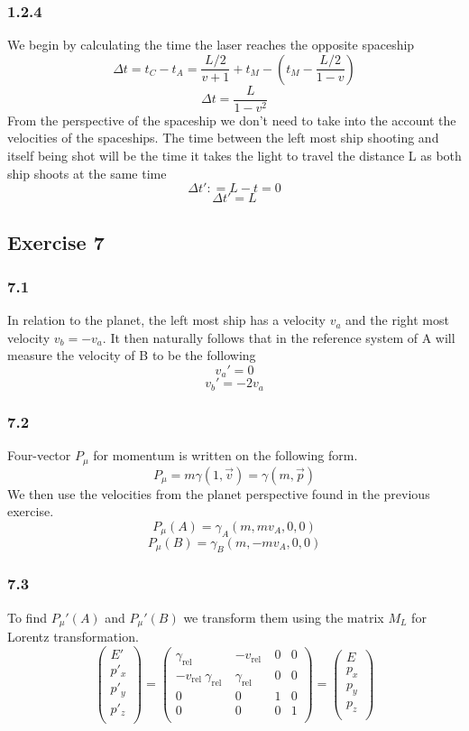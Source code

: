 \documentclass[reprint,english,notitlepage]{revtex4-2}
\begin{document}
\subsubsection*{1.2.4}\label{1.2.4}
We begin by calculating the time the laser reaches the opposite spaceship
\[
Δt =  t_C - t_A = \frac{L / 2}{v +1} + t_M - \left( t_M - \frac{L / 2}{1 - v} \right) 
\]
\[
Δt = \frac{L}{1 - v^{2}}
\]
From the perspective of the spaceship we don't need to take into the account the velocities of the spaceships. The time between the left most ship shooting and itself being shot will be the time it takes the light to travel the distance L as both ship shoots at the same time
\[
Δt': = L - t = 0
\]
\[
Δt' = L
\]


\subsection{Exercise 7}\label{smiley: 7}
\subsubsection*{7.1}
In relation to the planet, the left most ship has a velocity $ v_a $ and the right most velocity $ v_{b} = -v_a $. It then naturally follows that in the reference system of A will measure the velocity of B to be the following
\[
v_a' = 0 
\]
\[
v_b' = -2 v_a
\]
\subsubsection*{7.2}
Four-vector $ P_{μ} $ for momentum is written on the following form. 
\[
P_{μ} = m γ(1, \vec{v}) = γ(m,\vec{p})
\]
We then use the velocities from the planet perspective found in the previous exercise. 
\[
P_{μ}(A) = γ_{A}(m, mv_{A}, 0, 0)
\]
\[
P_{μ}(B) = γ_{B}(m, -mv_{A}, 0, 0)
\]

\subsubsection*{7.3}
To find $ P_{μ}'(A) $ and $ P_{μ}'(B) $ we transform them using the  matrix $ M_L $ for Lorentz transformation. 
\[
  \begin{pmatrix}
    E' \\
    p'_{x} \\
    p'_{y} \\
    p'_{z} \\
   \end{pmatrix} = 
   \begin{pmatrix}
     γ_{\text{rel }} & - v_{\text{rel }} &0  &0  \\
      -v_{\text{rel }} γ_{\text{rel }}&γ_{\text{rel }}  &0  &0  \\
      0&  0&  1& 0 \\
      0&  0&  0& 1 \\
    \end{pmatrix} = 
    \begin{pmatrix}
       E \\
       p_{x} \\
       p_{y} \\
       p_{z} \\
      \end{pmatrix}
\]
\end{document}
